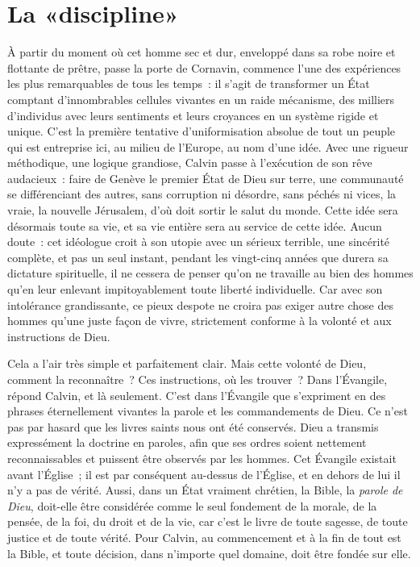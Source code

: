 \documentclass[french,twoside]{book} %
\newcommand\chapteropen{} %
\newcommand\chaptercont{} %
\begin{document}
\chapteropen
\chapter[{La «discipline»}]{La «discipline»}\renewcommand{\leftmark}{La «discipline»}


\chaptercont
\noindent À partir du moment où cet homme sec et dur, enveloppé dans sa robe noire et flottante de prêtre, passe la porte de Cornavin, commence l’une des expériences les plus remarquables de tous les temps : il s’agit de transformer un État comptant d’innombrables cellules vivantes en un raide mécanisme, des milliers d’individus avec leurs sentiments et leurs croyances en un système rigide et unique. C’est la première tentative d’uniformisation absolue de tout un peuple qui est entreprise ici, au milieu de l’Europe, au nom d’une idée. Avec une rigueur méthodique, une logique grandiose, Calvin passe à l’exécution de son rêve audacieux : faire de Genève le premier État de Dieu sur terre, une communauté se différenciant des autres, sans corruption ni désordre, sans péchés ni vices, la vraie, la nouvelle Jérusalem, d’où doit sortir le salut du monde. Cette idée sera désormais toute sa vie, et sa vie entière sera au service de cette idée. Aucun doute : cet idéologue croit à son utopie avec un sérieux terrible, une sincérité complète, et pas un seul instant, pendant les vingt-cinq années que durera sa dictature spirituelle, il ne cessera de penser qu’on ne travaille au bien des hommes qu’en leur enlevant impitoyablement toute liberté individuelle. Car avec son intolérance grandissante, ce pieux despote ne croira pas exiger autre chose des hommes qu’une juste façon de vivre, strictement conforme à la volonté et aux instructions de Dieu.\par
Cela a l’air très simple et parfaitement clair. Mais cette volonté de Dieu, comment la reconnaître ? Ces instructions, où les trouver ? Dans l’Évangile, répond Calvin, et là seulement. C’est dans l’Évangile que s’expriment en des phrases éternellement vivantes la parole et les commandements de Dieu. Ce n’est pas par hasard que les livres saints nous ont été conservés. Dieu a transmis expressément la doctrine en paroles, afin que ses ordres soient nettement reconnaissables et puissent être observés par les hommes. Cet Évangile existait avant l’Église ; il est par conséquent au-dessus de l’Église, et en dehors de lui il n’y a pas de vérité. Aussi, dans un État vraiment chrétien, la Bible, la \emph{parole de Dieu}, doit-elle être considérée comme le seul fondement de la morale, de la pensée, de la foi, du droit et de la vie, car c’est le livre de toute sagesse, de toute justice et de toute vérité. Pour Calvin, au commencement et à la fin de tout est la Bible, et toute décision, dans n’importe quel domaine, doit être fondée sur elle.\par
\end{document}
